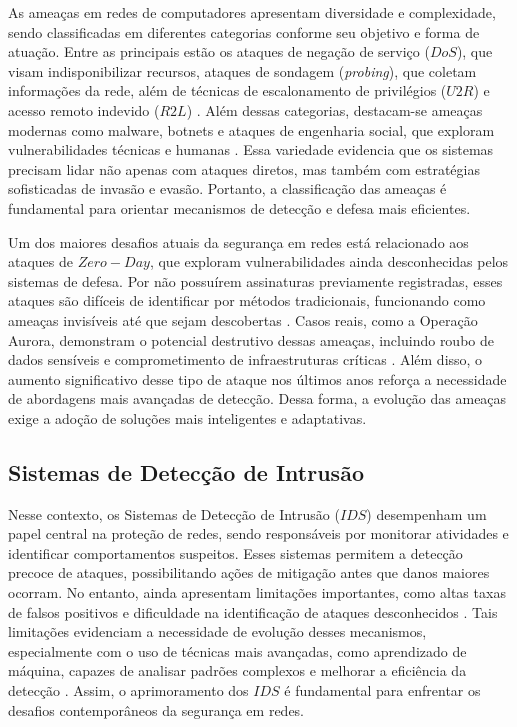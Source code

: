 \documentclass[a4paper,10pt, twocolumn]{article}
\begin{document}
As ameaças em redes de computadores apresentam diversidade e complexidade, 
sendo classificadas em diferentes categorias conforme seu objetivo e forma de 
atuação. Entre as principais estão os ataques de negação de serviço ($DoS$), 
que visam indisponibilizar recursos, ataques de sondagem (\textit{probing}), que 
coletam informações da rede, além de técnicas de escalonamento de privilégios 
($U2R$) e acesso remoto indevido ($R2L$) \cite{wasyhun2023cyber}. Além dessas categorias, destacam-se
ameaças modernas como malware, botnets e ataques de engenharia social, que 
exploram vulnerabilidades técnicas e humanas \cite{Thakkar2021Survey} \cite{solane2015using}. Essa variedade evidencia que os 
sistemas precisam lidar não apenas com ataques diretos, mas também com 
estratégias sofisticadas de invasão e evasão. Portanto, a classificação das 
ameaças é fundamental para orientar mecanismos de detecção e defesa mais 
eficientes. 

Um dos maiores desafios atuais da segurança em redes está relacionado aos 
ataques de $Zero-Day$, que exploram vulnerabilidades ainda desconhecidas pelos 
sistemas de defesa. Por não possuírem assinaturas previamente registradas, 
esses ataques são difíceis de identificar por métodos tradicionais, 
funcionando como ameaças invisíveis até que sejam descobertas \cite{wasyhun2023cyber}. Casos reais, 
como a Operação Aurora, demonstram o potencial destrutivo dessas ameaças, 
incluindo roubo de dados sensíveis e comprometimento de infraestruturas 
críticas \cite{wasyhun2023cyber}. Além disso, o aumento significativo desse tipo de ataque nos últimos 
anos reforça a necessidade de abordagens mais avançadas de detecção. Dessa 
forma, a evolução das ameaças exige a adoção de soluções mais inteligentes e 
adaptativas. 

\subsection{Sistemas de Detecção de Intrusão}
Nesse contexto, os Sistemas de Detecção de Intrusão ($IDS$) desempenham um papel 
central na proteção de redes, sendo responsáveis por monitorar atividades e 
identificar comportamentos suspeitos. Esses sistemas permitem a detecção 
precoce de ataques, possibilitando ações de mitigação antes que danos maiores 
ocorram. No entanto, ainda apresentam limitações importantes, como altas taxas 
de falsos positivos e dificuldade na identificação de ataques desconhecidos \cite{emad2022intrusion}. 
Tais limitações evidenciam a necessidade de evolução desses mecanismos, 
especialmente com o uso de técnicas mais avançadas, como aprendizado de 
máquina, capazes de analisar padrões complexos e melhorar a eficiência da 
detecção \cite{patrick2022study}. Assim, o aprimoramento dos $IDS$ é fundamental para enfrentar os 
desafios contemporâneos da segurança em redes. 
\end{document}
